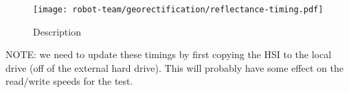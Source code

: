 \begin{figure}[h]
  \texttt{[image: robot-team/georectification/reflectance-timing.pdf]}
  \caption{Description}
  \label{fig-reflectance-timing}
\end{figure}

NOTE: we need to update these timings by first copying the HSI to the local drive (off of the external hard drive). This will probably have some effect on the read/write speeds for the test.







